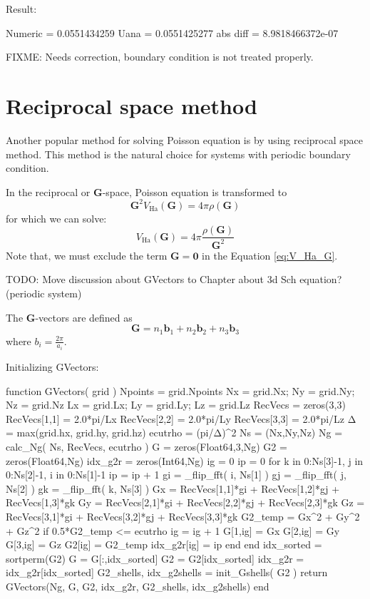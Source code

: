Result:
\begin{textcode}
Numeric  =       0.0551434259
Uana     =       0.0551425277
abs diff =   8.9818466372e-07
\end{textcode}

FIXME: Needs correction, boundary condition is not treated properly.

\section{Reciprocal space method}

Another popular method for solving Poisson equation is by using
reciprocal space method.
This method is the natural choice for systems with periodic boundary condition.

In the reciprocal or $\mathbf{G}$-space, Poisson equation is transformed to
\begin{equation}
\mathbf{G}^{2} V_{\mathrm{Ha}}(\mathbf{G}) = 4\pi\rho(\mathbf{G})
\end{equation}
for which we can solve:
\begin{equation}
V_{\mathrm{Ha}}(\mathbf{G}) = 4\pi \frac{\rho(\mathbf{G})}{\mathbf{G}^{2}}
\label{eq:V_Ha_G}
\end{equation}
Note that, we must exclude the term $\mathbf{G}=\mathbf{0}$ in the Equation
\ref{eq:V_Ha_G}.

TODO: Move discussion about GVectors to Chapter about 3d Sch equation?
(periodic system)

The $\mathbf{G}$-vectors are defined as
\begin{equation}
\mathbf{G} = n_{1}\mathbf{b}_{1} + n_{2}\mathbf{b}_{2} + n_{3}\mathbf{b}_{3}
\end{equation}
where $b_{i} = \frac{2\pi}{a_{i}}$.

Initializing GVectors:
\begin{juliacode}
function GVectors( grid )
  Npoints = grid.Npoints
  Nx = grid.Nx; Ny = grid.Ny; Nz = grid.Nz
  Lx = grid.Lx; Ly = grid.Ly; Lz = grid.Lz
  RecVecs = zeros(3,3)
  RecVecs[1,1] = 2.0*pi/Lx
  RecVecs[2,2] = 2.0*pi/Ly
  RecVecs[3,3] = 2.0*pi/Lz
  Δ = max(grid.hx, grid.hy, grid.hz)
  ecutrho = (pi/Δ)^2
  Ns = (Nx,Ny,Nz)
  Ng = calc_Ng( Ns, RecVecs, ecutrho )
  G  = zeros(Float64,3,Ng)
  G2 = zeros(Float64,Ng)
  idx_g2r = zeros(Int64,Ng)
  ig = 0
  ip = 0
  for k in 0:Ns[3]-1, j in 0:Ns[2]-1, i in 0:Ns[1]-1
      ip = ip + 1
      gi = _flip_fft( i, Ns[1] )
      gj = _flip_fft( j, Ns[2] )
      gk = _flip_fft( k, Ns[3] )
      Gx = RecVecs[1,1]*gi + RecVecs[1,2]*gj + RecVecs[1,3]*gk
      Gy = RecVecs[2,1]*gi + RecVecs[2,2]*gj + RecVecs[2,3]*gk
      Gz = RecVecs[3,1]*gi + RecVecs[3,2]*gj + RecVecs[3,3]*gk
      G2_temp = Gx^2 + Gy^2 + Gz^2
      if 0.5*G2_temp <= ecutrho
          ig = ig + 1
          G[1,ig] = Gx
          G[2,ig] = Gy
          G[3,ig] = Gz
          G2[ig] = G2_temp
          idx_g2r[ig] = ip
      end
  end
  idx_sorted = sortperm(G2)
  G = G[:,idx_sorted]
  G2 = G2[idx_sorted]
  idx_g2r = idx_g2r[idx_sorted]
  G2_shells, idx_g2shells = init_Gshells( G2 )
  return GVectors(Ng, G, G2, idx_g2r, G2_shells, idx_g2shells)
end
\end{juliacode}

